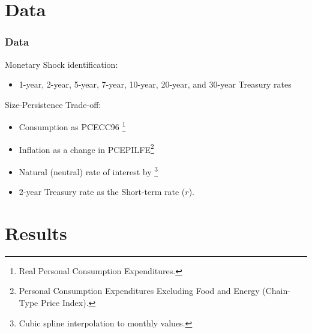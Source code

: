 \documentclass[11pt,pdf,aspectratio=129]{beamer}
\begin{document}
\section{Data}
\begin{frame}\frametitle{Data}
    Monetary Shock identification:
    \begin{itemize}
        \item  1-year, 2-year, 5-year, 7-year, 10-year, 20-year, and 30-year Treasury rates 
    \end{itemize}
Size-Persistence Trade-off:
\begin{itemize}
    \item Consumption as PCECC96 \footnote{Real Personal Consumption Expenditures.} \footnotemark[7]
        \item Inflation as a change in PCEPILFE\footnote{Personal Consumption Expenditures Excluding Food and Energy (Chain-Type Price Index).} 
        \item Natural (neutral) rate of interest by \footnote{Cubic spline interpolation to monthly values.}
        \item 2-year Treasury rate as the Short-term rate ($r$).
    \end{itemize}
\end{frame}

    




\section{Results}
\end{document}
